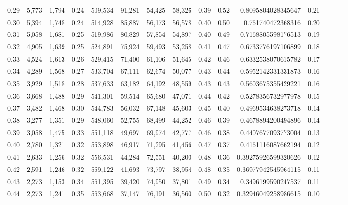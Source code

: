 \begin{tabular}{rrrrrrrrrrrrrrr}
0.29 &   5,773 &  1,794 &  0.24 &  509,534 &   91,281 &   54,425 &   58,326 &  0.39 &  0.52 &    0.8095804028345647 &      0.21 \\
0.30 &   5,394 &  1,748 &  0.24 &  514,928 &   85,887 &   56,173 &   56,578 &  0.40 &  0.50 &     0.761740472368316 &      0.20 \\
0.31 &   5,058 &  1,681 &  0.25 &  519,986 &   80,829 &   57,854 &   54,897 &  0.40 &  0.49 &    0.7168805598176513 &      0.19 \\
0.32 &   4,905 &  1,639 &  0.25 &  524,891 &   75,924 &   59,493 &   53,258 &  0.41 &  0.47 &    0.6733776197106899 &      0.18 \\
0.33 &   4,524 &  1,613 &  0.26 &  529,415 &   71,400 &   61,106 &   51,645 &  0.42 &  0.46 &    0.6332538070615782 &      0.17 \\
0.34 &   4,289 &  1,568 &  0.27 &  533,704 &   67,111 &   62,674 &   50,077 &  0.43 &  0.44 &    0.5952142331331873 &      0.16 \\
0.35 &   3,929 &  1,518 &  0.28 &  537,633 &   63,182 &   64,192 &   48,559 &  0.43 &  0.43 &    0.5603675355429221 &      0.16 \\
0.36 &   3,668 &  1,488 &  0.29 &  541,301 &   59,514 &   65,680 &   47,071 &  0.44 &  0.42 &    0.5278356732977978 &      0.15 \\
0.37 &   3,482 &  1,468 &  0.30 &  544,783 &   56,032 &   67,148 &   45,603 &  0.45 &  0.40 &    0.4969534638273718 &      0.14 \\
0.38 &   3,277 &  1,351 &  0.29 &  548,060 &   52,755 &   68,499 &   44,252 &  0.46 &  0.39 &    0.4678894200494896 &      0.14 \\
0.39 &   3,058 &  1,475 &  0.33 &  551,118 &   49,697 &   69,974 &   42,777 &  0.46 &  0.38 &    0.4407677093773004 &      0.13 \\
0.40 &   2,780 &  1,321 &  0.32 &  553,898 &   46,917 &   71,295 &   41,456 &  0.47 &  0.37 &    0.4161116087662194 &      0.12 \\
0.41 &   2,633 &  1,256 &  0.32 &  556,531 &   44,284 &   72,551 &   40,200 &  0.48 &  0.36 &   0.39275926599320626 &      0.12 \\
0.42 &   2,591 &  1,246 &  0.32 &  559,122 &   41,693 &   73,797 &   38,954 &  0.48 &  0.35 &   0.36977942545964115 &      0.11 \\
0.43 &   2,273 &  1,153 &  0.34 &  561,395 &   39,420 &   74,950 &   37,801 &  0.49 &  0.34 &    0.3496199590247537 &      0.11 \\
0.44 &   2,273 &  1,241 &  0.35 &  563,668 &   37,147 &   76,191 &   36,560 &  0.50 &  0.32 &   0.32946049258986615 &      0.10 \\

\end{tabular}
